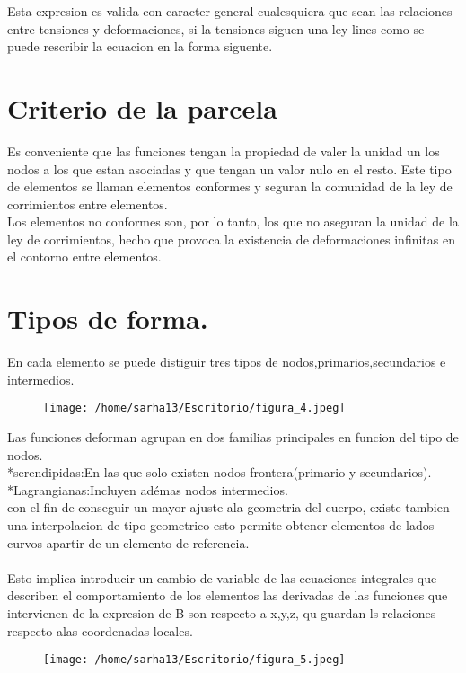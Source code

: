 \documentclass[letter,openright,12pt,spanish]{report}
\begin{document}
Esta expresion es valida con caracter general cualesquiera que sean las relaciones entre tensiones y deformaciones, si la tensiones siguen una ley lines como se puede rescribir la ecuacion en la forma siguente.

\section{Criterio de la parcela}
Es conveniente que las funciones tengan la propiedad de valer la unidad un los nodos a los que estan asociadas y que tengan un valor nulo en el resto. Este tipo de elementos se llaman elementos conformes y seguran la comunidad de la ley de corrimientos entre elementos.\\
Los elementos no conformes son, por lo tanto, los que no aseguran la unidad de la ley de corrimientos, hecho que provoca la existencia de deformaciones infinitas en el contorno entre elementos.

\section{Tipos de forma.}
En cada elemento se puede distiguir tres tipos de nodos,primarios,secundarios e intermedios.

\begin{figure}[htp!]
\centering
\texttt{[image: /home/sarha13/Escritorio/figura\_4.jpeg]}
\caption{}
\label{Figura 5.}
\end{figure}

Las funciones deforman agrupan en dos familias principales en funcion del tipo de nodos.\\
*serendipidas:En las que solo existen nodos frontera(primario y secundarios).\\
*Lagrangianas:Incluyen adémas nodos intermedios.\\
con el fin de conseguir un mayor ajuste ala geometria del cuerpo, existe tambien una interpolacion de tipo geometrico esto permite obtener elementos de lados curvos apartir de un elemento de referencia.\\\\
Esto implica introducir un cambio de variable de las ecuaciones integrales que describen el comportamiento de los elementos las derivadas de las funciones que intervienen de la expresion de B son respecto a x,y,z, qu guardan ls relaciones respecto alas coordenadas locales.

\begin{figure}[htp!]
\centering
\texttt{[image: /home/sarha13/Escritorio/figura\_5.jpeg]}
\caption{}
\label{Figura 6.}
\end{figure}
\end{document}
